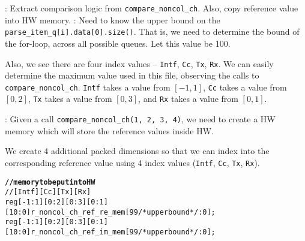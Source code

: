 \documentclass{note}
\begin{document}
\w {}: Extract comparison logic from \verb+compare_noncol_ch+. 
   Also, copy reference value into HW memory.
  \ben
  \w {}: Need to know the upper bound on the
   \verb+parse_item_q[i].data[0].size()+. 
    That is, we need to determine the bound of the for-loop, across all
    possible queues. Let this value be 100.
 
    Also, we see there are four index values -- \verb+Intf+, \verb+Cc+,
    \verb+Tx+, \verb+Rx+. We can easily determine the maximum value used in
    this file, observing the calls to \verb+compare_noncol_ch+. 
    \verb+Intf+ takes a value from $[-1, 1]$,
    \verb+Cc+ takes a value from $[0, 2]$,
    \verb+Tx+ takes a value from $[0, 3]$, and
    \verb+Rx+ takes a value from $[0, 1]$. 

  \w {}: 
   Given a call \textcolor{red2}{\tt{}compare\_noncol\_ch(1, 2, 3, 4)},  
   we need to create a HW memory which will store the reference values 
   inside HW.

   We create 4 additional packed dimensions so that we can index into the
   corresponding reference value using 4 index values (\verb+Intf+, \verb+Cc+,
   \verb+Tx+, \verb+Rx+). 
  \begin{alltt}
  \textcolor{red2}{\textbf{// memory to be put into HW}
  //  [Intf] [Cc ] [Tx ] [Rx ]
  reg [-1:1] [0:2] [0:3] [0:1] [10:0] r_noncol_ch_ref_re_mem[99/*upperbound*/:0];
  reg [-1:1] [0:2] [0:3] [0:1] [10:0] r_noncol_ch_ref_im_mem[99/*upperbound*/:0];
}
  \end{alltt}
\end{document}
